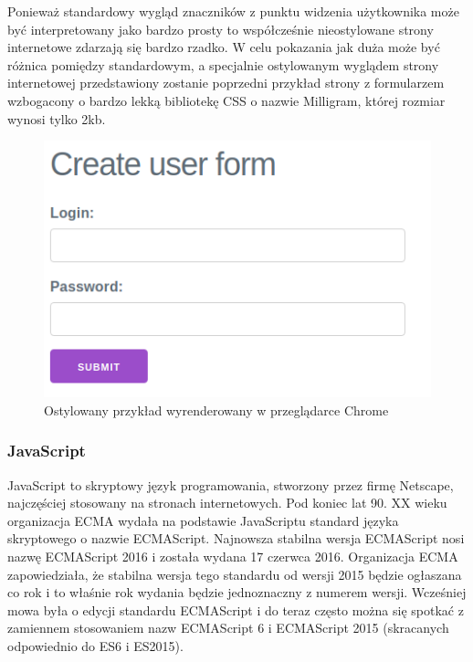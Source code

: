 \documentclass[polish, twoside, 12pt]{mwart}
\begin{document}
Ponieważ standardowy wygląd znaczników z punktu widzenia użytkownika może być interpretowany jako bardzo prosty to współcześnie nieostylowane strony internetowe zdarzają się bardzo rzadko. W celu pokazania jak duża może być różnica pomiędzy standardowym, a specjalnie ostylowanym wyglądem strony internetowej przedstawiony zostanie poprzedni przykład strony z formularzem wzbogacony o bardzo lekką bibliotekę CSS o nazwie Milligram\cite{milligram}, której rozmiar wynosi tylko 2kb.

\begin{figure}[ht]
  \includegraphics[width=\textwidth]{html-css-chrome.png}
	\caption{Ostylowany przykład wyrenderowany w przeglądarce Chrome}
\end{figure}

\subsubsection{JavaScript}

JavaScript to skryptowy język programowania, stworzony przez firmę Netscape, najczęściej stosowany na stronach internetowych. Pod koniec lat 90. XX wieku organizacja ECMA wydała na podstawie JavaScriptu standard języka skryptowego o nazwie ECMAScript. Najnowsza stabilna wersja ECMAScript nosi nazwę ECMAScript 2016 \cite{es2016} i została wydana 17 czerwca 2016. Organizacja ECMA zapowiedziała, że stabilna wersja tego standardu od wersji 2015 będzie ogłaszana co rok i to właśnie rok wydania będzie jednoznaczny z numerem wersji. Wcześniej mowa była o edycji standardu ECMAScript i do teraz często można się spotkać z zamiennem stosowaniem nazw ECMAScript 6 i ECMAScript 2015 (skracanych odpowiednio do ES6 i ES2015).
\end{document}
